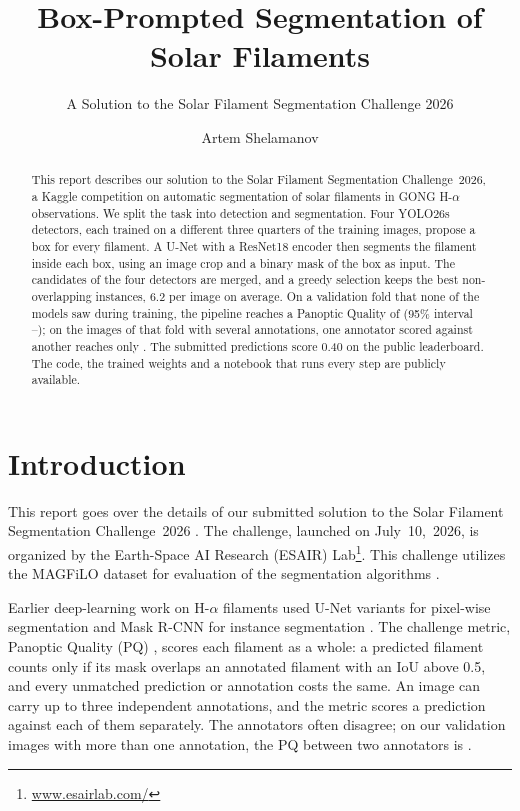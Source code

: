 \documentclass[sigconf,nonacm]{acmart}
\begin{document}
\title{Box-Prompted Segmentation of Solar Filaments}
\subtitle{A Solution to the Solar Filament Segmentation Challenge 2026} %

\author{Artem Shelamanov}

\begin{abstract}
    This report describes our solution to the Solar Filament Segmentation Challenge~2026, a Kaggle competition on automatic segmentation of solar filaments in GONG H-$\alpha$ observations. We split the task into detection and segmentation. Four YOLO26s detectors, each trained on a different three quarters of the training images, propose a box for every filament. A U-Net with a ResNet18 encoder then segments the filament inside each box, using an image crop and a binary mask of the box as input. The candidates of the four detectors are merged, and a greedy selection keeps the best non-overlapping instances, 6.2 per image on average. On a validation fold that none of the models saw during training, the pipeline reaches a Panoptic Quality of \valPQ{} (95\% interval \valLo--\valHi); on the images of that fold with several annotations, one annotator scored against another reaches only \annPQ{}. The submitted predictions score 0.40 on the public leaderboard. The code, the trained weights and a notebook that runs every step are publicly available.
\end{abstract}

\maketitle

\section{Introduction}
    This report goes over the details of our submitted solution to the Solar Filament Segmentation Challenge~2026 \cite{filament-segmentation-2026}. The challenge, launched on July~10,~2026, is organized by the Earth-Space AI Research (ESAIR) Lab\footnote{\href{https://www.esairlab.com/home}{www.esairlab.com/}}. This challenge utilizes the MAGFiLO dataset for evaluation of the segmentation algorithms \cite{ahmadzadeh2024dataset}.

    Earlier deep-learning work on H-$\alpha$ filaments used U-Net variants for pixel-wise segmentation \cite{liu2021filament} and Mask R-CNN for instance segmentation \cite{ahmadzadeh2019toward}. The challenge metric, Panoptic Quality (PQ) \cite{kirillov2019panoptic}, scores each filament as a whole: a predicted filament counts only if its mask overlaps an annotated filament with an IoU above 0.5, and every unmatched prediction or annotation costs the same. An image can carry up to three independent annotations, and the metric scores a prediction against each of them separately. The annotators often disagree; on our validation images with more than one annotation, the PQ between two annotators is \annPQ{}.
\end{document}
